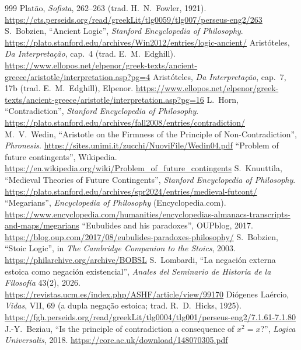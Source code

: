 \begin{thebibliography}{999}\setlength{\itemsep}{0.2em}
 Platão, \emph{Sofista}, 262--263 (trad. H.~N.~Fowler, 1921). \url{https://cts.perseids.org/read/greekLit/tlg0059/tlg007/perseus-eng2/263}
 S.~Bobzien, \enquote{Ancient Logic}, \emph{Stanford Encyclopedia of Philosophy}. \url{https://plato.stanford.edu/archives/Win2012/entries/logic-ancient/}
 Aristóteles, \emph{Da Interpretação}, cap.~4 (trad. E.~M.~Edghill). \url{https://www.ellopos.net/elpenor/greek-texts/ancient-greece/aristotle/interpretation.asp?pg=4}
 Aristóteles, \emph{Da Interpretação}, cap.~7, 17b (trad. E.~M.~Edghill), Elpenor. \url{https://www.ellopos.net/elpenor/greek-texts/ancient-greece/aristotle/interpretation.asp?pg=16}
 L.~Horn, \enquote{Contradiction}, \emph{Stanford Encyclopedia of Philosophy}. \url{https://plato.stanford.edu/archives/fall2008/entries/contradiction/}
 M.~V.~Wedin, \enquote{Aristotle on the Firmness of the Principle of Non-Contradiction}, \emph{Phronesis}. \url{https://sites.unimi.it/zucchi/NuoviFile/Wedin04.pdf}
 \enquote{Problem of future contingents}, Wikipedia. \url{https://en.wikipedia.org/wiki/Problem_of_future_contingents}
 S.~Knuuttila, \enquote{Medieval Theories of Future Contingents}, \emph{Stanford Encyclopedia of Philosophy}. \url{https://plato.stanford.edu/archives/spr2024/entries/medieval-futcont/}
 \enquote{Megarians}, \emph{Encyclopedia of Philosophy} (Encyclopedia.com). \url{https://www.encyclopedia.com/humanities/encyclopedias-almanacs-transcripts-and-maps/megarians}
 \enquote{Eubulides and his paradoxes}, OUPblog, 2017. \url{https://blog.oup.com/2017/08/eubulides-paradoxes-philosophy/}
 S.~Bobzien, \enquote{Stoic Logic}, in \emph{The Cambridge Companion to the Stoics}, 2003. \url{https://philarchive.org/archive/BOBSL}
 S.~Lombardi, \enquote{La negación externa estoica como negación existencial}, \emph{Anales del Seminario de Historia de la Filosofía} 43(2), 2026. \url{https://revistas.ucm.es/index.php/ASHF/article/view/99170}
 Diógenes Laércio, \emph{Vidas}, VII, 69 (a dupla negação estoica; trad. R.~D.~Hicks, 1925). \url{https://fgh.perseids.org/read/greekLit/tlg0004/tlg001/perseus-eng2/7.1.61-7.1.80}
 J.-Y.~Beziau, \enquote{Is the principle of contradiction a consequence of $x^2=x$?}, \emph{Logica Universalis}, 2018. \url{https://core.ac.uk/download/148070305.pdf}

\end{thebibliography}
